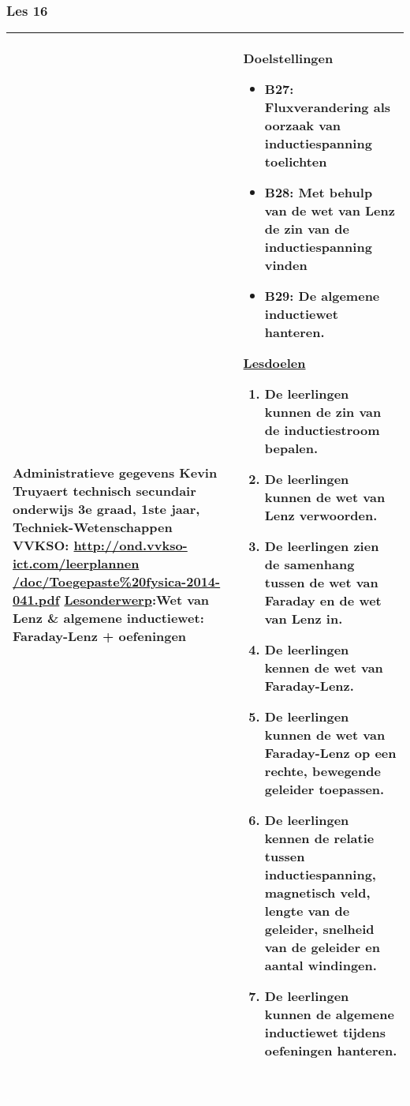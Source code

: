 


\begin{landscape}
	\subsubsection{Les 16}
	\begin{tabularx}{1.56\textwidth}{|p{}|X|}\hline
		\textbf{Administratieve gegevens}\newline\newline
		Kevin Truyaert\newline\newline
		technisch secundair onderwijs\newline
		3e graad, 1ste jaar, Techniek-Wetenschappen\newline
		VVKSO: \href{http://ond.vvkso-ict.com/leerplannen/doc/Toegepaste\%20fysica-2014-041.pdf}{http://ond.vvkso-ict.com/leerplannen /doc/Toegepaste\%20fysica-2014-041.pdf} \newline
		\underline{Lesonderwerp}:\newline Wet van Lenz \& algemene inductiewet: Faraday-Lenz + oefeningen & \textbf{Doelstellingen}
		\begin{itemize}[itemsep=0.08\baselineskip]
			\item B27: Fluxverandering als oorzaak van inductiespanning toelichten
			\item B28: Met behulp van de wet van Lenz de zin van de inductiespanning vinden
			\item B29: De algemene inductiewet hanteren.
		\end{itemize}
		\underline{Lesdoelen}\newline
		\vspace{-0.75cm}
		\begin{enumerate}[itemsep=0.08\baselineskip]
			\item De leerlingen kunnen de zin van de inductiestroom bepalen.
			\item De leerlingen kunnen de wet van Lenz verwoorden.
			\item De leerlingen zien de samenhang tussen de wet van Faraday en de wet van Lenz in.
			\item De leerlingen kennen de wet van Faraday-Lenz.
			\item De leerlingen kunnen de wet van Faraday-Lenz op een rechte, bewegende geleider toepassen.
			\item De leerlingen kennen de relatie tussen inductiespanning, magnetisch veld, lengte van de geleider, snelheid van de geleider en aantal windingen.
			\item De leerlingen kunnen de algemene inductiewet tijdens oefeningen hanteren.
		\end{enumerate} \\\hline
	\end{tabularx}\vfill \textcolor{white}{.} 



\end{landscape}
